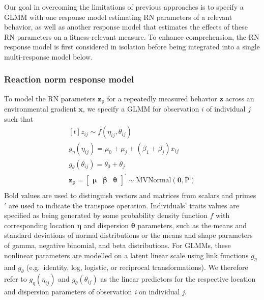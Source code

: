 \documentclass{article}
\begin{document}
Our goal in overcoming the limitations of previous approaches is to
specify a GLMM with one response model estimating RN parameters of a
relevant behavior, as well as another response model that estimates the
effects of these RN parameters on a fitness-relevant measure. To enhance
comprehension, the RN response model is first considered in isolation
before being integrated into a single multi-response model below.

\hypertarget{reaction-norm-response-model}{%
\subsubsection{Reaction norm response
model}\label{reaction-norm-response-model}}

To model the RN parameters \(\boldsymbol{z_{\mathrm{p}}}\) for a
repeatedly measured behavior \(\boldsymbol{z}\) across an environmental
gradient \(\boldsymbol{x}\), we specify a GLMM for observation \(i\) of
individual \(j\) such that \begin{equation} \tag{1.1}\label{eq:1.1}
\begin{gathered}[t]
z_{ij} \sim f \left(\eta_{ij}, \theta_{ij} \right)  \\
g_\eta \left( \eta_{ij} \right) = \mu_0 + \mu_j + \left(\beta_1 + \beta_j \right) x_{ij} \nonumber \\
g_\theta \left( \theta_{ij} \right) = \theta_0 + \theta_{j} \nonumber \\
 \boldsymbol{z_{\mathrm{p}}}= \begin{bmatrix}
\boldsymbol{\mu} &
\boldsymbol{\beta} &
\boldsymbol{\theta} \end{bmatrix} ^{\prime}
\sim \mathrm{M}\mathrm{VNormal} \left(
\boldsymbol{0},\boldsymbol{\mathrm{P}} \right) \nonumber \\ 
\end{gathered}
\end{equation} Bold values are used to distinguish vectors and matrices
from scalars and primes \(\prime\) are used to indicate the transpose
operation. Individuals' traits values are specified as being generated
by some probability density function \(f\) with corresponding location
\(\boldsymbol{\eta}\) and dispersion \(\boldsymbol{\theta}\) parameters,
such as the means and standard deviations of normal distributions or the
means and shape parameters of gamma, negative binomial, and beta
distributions. For GLMMs, these nonlinear parameters are modelled on a
latent linear scale using link functions \(g_{\eta}\) and \(g_{\theta}\)
(e.g.~identity, log, logistic, or reciprocal transformations). We
therefore refer to \(g_{\eta}(\eta_{ij})\) and
\(g_{\theta}(\theta_{ij})\) as the linear predictors for the respective
location and dispersion parameters of observation \emph{i} on individual
\emph{j}.
\end{document}
